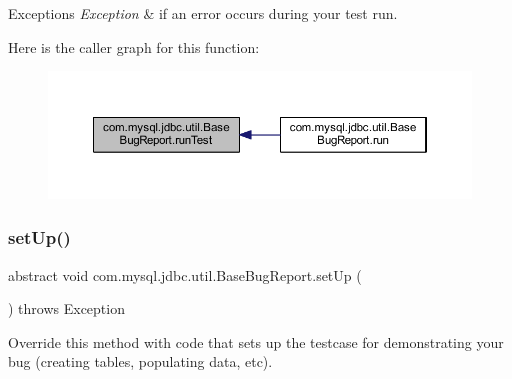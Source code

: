 \begin{DoxyExceptions}{Exceptions}
{\em Exception} & if an error occurs during your test run. \\
\hline
\end{DoxyExceptions}
Here is the caller graph for this function\+:
\nopagebreak
\begin{figure}[H]
\begin{center}
\leavevmode
\includegraphics[width=350pt]{classcom_1_1mysql_1_1jdbc_1_1util_1_1_base_bug_report_ad870550c2d0f04bc0286066d8d8ebe5f_icgraph}
\end{center}
\end{figure}
\mbox{\label{classcom_1_1mysql_1_1jdbc_1_1util_1_1_base_bug_report_aad06cc210e16377a2837266b087ea2ce}} 
\subsubsection{\texorpdfstring{set\+Up()}{setUp()}}
{\footnotesize\ttfamily abstract void com.\+mysql.\+jdbc.\+util.\+Base\+Bug\+Report.\+set\+Up (\begin{DoxyParamCaption}{ }\end{DoxyParamCaption}) throws Exception\hspace{0.3cm}{\ttfamily [abstract]}}

Override this method with code that sets up the testcase for demonstrating your bug (creating tables, populating data, etc).


